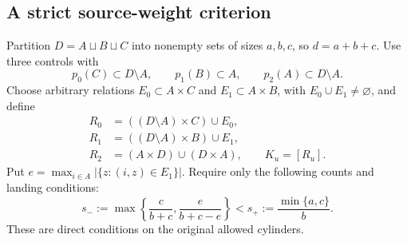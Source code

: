 \documentclass[11pt,reqno]{amsart}
\numberwithin{equation}{section}
\theoremstyle{definition}
\theoremstyle{definition}
\begin{document}
\subsection{A strict source-weight criterion}
Partition $D=A\sqcup B\sqcup C$ into nonempty sets of sizes
$a,b,c$, so $d=a+b+c$. Use three controls with
\begin{equation}\label{eq:weight-land}
 p_0(C)\subset D\setminus A,\qquad p_1(B)\subset A,
 \qquad p_2(A)\subset D\setminus A.
\end{equation}
Choose arbitrary relations $E_0\subset A\times C$ and
$E_1\subset A\times B$, with $E_0\cup E_1\ne\varnothing$,
and define
\begin{align}
 R_0&=((D\setminus A)\times C)\cup E_0,\nonumber\\
 R_1&=((D\setminus A)\times B)\cup E_1,\label{eq:weight-domains}\\
 R_2&=(A\times D)\cup(D\times A),\qquad K_u=[R_u].\nonumber
\end{align}
Put $e=\max_{i\in A}|\{z:(i,z)\in E_1\}|$. Require only
the following counts and landing conditions:
\begin{equation}\label{eq:weight-count}
 s_-:=\max\left\{\frac c{b+c},\frac e{b+c-e}\right\}
 <s_+:=\frac{\min\{a,c\}}b.
\end{equation}
These are direct conditions on the original allowed cylinders.
\end{document}
